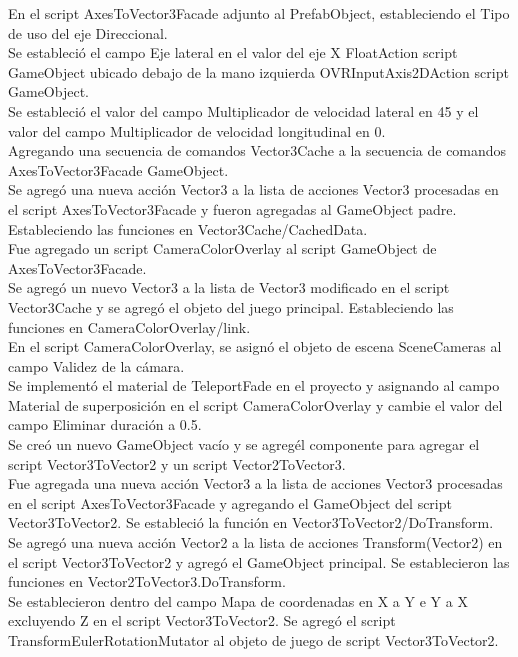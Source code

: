 En el script AxesToVector3Facade adjunto al PrefabObject, estableciendo el Tipo de uso del eje Direccional.\\
Se  estableció el campo Eje lateral en el valor del eje X FloatAction script GameObject ubicado debajo de la mano izquierda OVRInputAxis2DAction script GameObject.\\
Se estableció el valor del campo Multiplicador de velocidad lateral en 45 y el valor del campo Multiplicador de velocidad longitudinal en 0.\\
Agregando una secuencia de comandos Vector3Cache a la secuencia de comandos AxesToVector3Facade GameObject.\\
Se agregó una nueva acción Vector3 a la lista de acciones Vector3 procesadas en el script AxesToVector3Facade y fueron agregadas al GameObject padre. 
Estableciendo las funciones en Vector3Cache/CachedData.\\
Fue agregado un script CameraColorOverlay al script GameObject de AxesToVector3Facade.\\
Se agregó un nuevo Vector3 a la lista de Vector3 modificado en el script Vector3Cache y  se agreg\'o el objeto del juego principal. Estableciendo las funciones en CameraColorOverlay/link.\\
En el script CameraColorOverlay, se asignó el objeto de escena SceneCameras al campo Validez de la cámara.\\
Se implementó el material de TeleportFade en el proyecto y asignando al campo Material de superposición en el script CameraColorOverlay y cambie el valor del campo Eliminar duración a 0.5.\\
Se creó un nuevo GameObject vacío y se agreg\' el componente para agregar el script Vector3ToVector2 y un script Vector2ToVector3.\\
Fue agregada una nueva acción Vector3 a la lista de acciones Vector3 procesadas en el script AxesToVector3Facade y agregando el GameObject del script Vector3ToVector2. Se estableció la 
función en Vector3ToVector2/DoTransform.\\
Se agregó una nueva acción Vector2 a la lista de acciones Transform(Vector2) en el script Vector3ToVector2 y agregó el GameObject principal. Se establecieron las funciones en 
Vector2ToVector3\/.DoTransform.\\
Se establecieron dentro del campo Mapa de coordenadas en X a Y e Y a X excluyendo Z en el script Vector3ToVector2. Se agregó el script TransformEulerRotationMutator al objeto de 
juego de script Vector3ToVector2.\\
